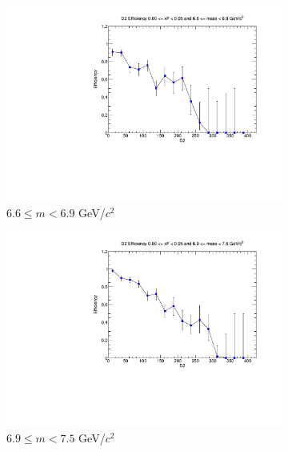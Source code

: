 \begin{figure}[p]
\begin{subfigure}[b]{0.32\textwidth}
        \includegraphics[width=\textwidth]{./kTrackerEfficiencyPlots/D2_Efficiency_xF0_mass8.pdf}
        \caption{$6.6 \leq m < 6.9$ GeV/$c^2$}
        \label{fig:xF0_mass8}
    \end{subfigure}
    \vspace{0.5cm}
    \begin{subfigure}[b]{0.32\textwidth}
        \centering
        \includegraphics[width=\textwidth]{./kTrackerEfficiencyPlots/D2_Efficiency_xF0_mass9.pdf}
        \caption{$6.9 \leq m < 7.5$ GeV/$c^2$}
        \label{fig:xF0_mass9}
    \end{subfigure}
    \hfill
    \begin{subfigure}[b]{0.32\textwidth}
        \centering

\end{subfigure}
\end{figure}
